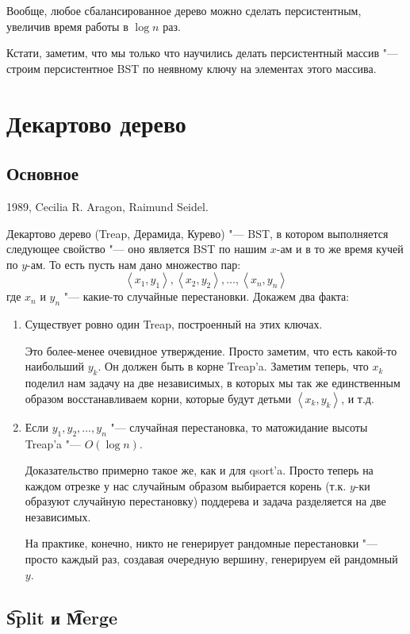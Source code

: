 Вообще, любое сбалансированное дерево можно сделать персистентным, увеличив время работы в $\log n$ раз.

Кстати, заметим, что мы только что научились делать персистентный массив "--- строим персистентное BST по неявному ключу
на элементах этого массива.

\section{Декартово дерево}

\subsection{Основное}

1989, Cecilia R. Aragon, Raimund Seidel.

Декартово дерево (Treap, Дерамида, Курево) "--- BST, в котором выполняется следующее свойство "--- оно является BST по нашим $x$-ам
и в то же время кучей по $y$-ам.
То есть пусть нам дано множество пар:
\[ \left<x_1, y_1\right>, \left<x_2, y_2\right>, \dots, \left<x_n, y_n\right> \]
где $x_n$ и $y_n$ "--- какие-то случайные перестановки. Докажем два факта:
\begin{enumerate}
\item
	Существует ровно один Treap, построенный на этих ключах.

	Это более-менее очевидное утверждение.
	Просто заметим, что есть какой-то наибольший $y_k$. Он должен быть в корне Treap'a.
	Заметим теперь, что $x_k$ поделил нам задачу на две независимых, в которых
	мы так же единственным образом восстанавливаем корни, которые будут
	детьми $\left<x_k, y_k\right>$, и т.д.

\item
	Если $y_1, y_2, ..., y_n$ "--- случайная перестановка, то матожидание высоты Treap'a "--- $O(\log n)$.

	Доказательство примерно такое же, как и для qsort'a.
	Просто теперь на каждом отрезке у нас случайным образом выбирается корень
	(т.к. $y$-ки образуют случайную перестановку) поддерева и задача разделяется на две независимых.

	На практике, конечно, никто не генерирует рандомные перестановки "--- просто каждый раз,
	создавая очередную вершину, генерируем ей рандомный $y$.
\end{enumerate}

\subsection{\t{Split} и \t{Merge}}


